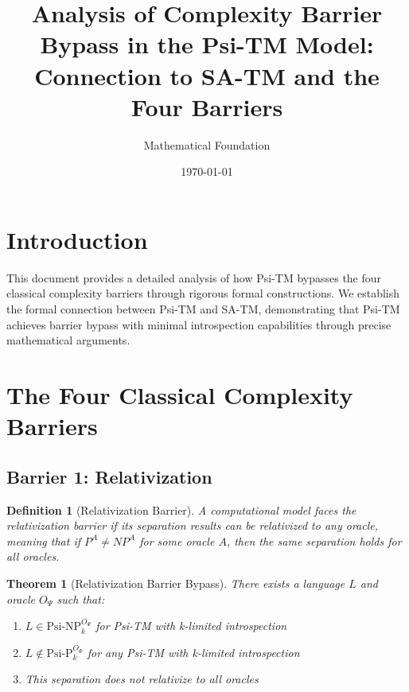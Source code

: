 \documentclass[11pt]{article}
\title{Analysis of Complexity Barrier Bypass in the Psi-TM Model:\\
Connection to SA-TM and the Four Barriers}
\author{Mathematical Foundation}
\date{\today}
\newtheorem{definition}{Definition}
\newtheorem{theorem}{Theorem}
\begin{document}
\maketitle

\section{Introduction}

This document provides a detailed analysis of how Psi-TM bypasses the four classical complexity barriers through rigorous formal constructions. We establish the formal connection between Psi-TM and SA-TM, demonstrating that Psi-TM achieves barrier bypass with minimal introspection capabilities through precise mathematical arguments.

\section{The Four Classical Complexity Barriers}

\subsection{Barrier 1: Relativization}

\begin{definition}[Relativization Barrier]
A computational model faces the relativization barrier if its separation results can be relativized to any oracle, meaning that if $P^A \neq NP^A$ for some oracle $A$, then the same separation holds for all oracles.
\end{definition}

\begin{theorem}[Relativization Barrier Bypass]
There exists a language $L$ and oracle $O_\Psi$ such that:
\begin{enumerate}
\item $L \in \text{Psi-NP}^{O_\Psi}_k$ for Psi-TM with k-limited introspection
\item $L \notin \text{Psi-P}^{O_\Psi}_k$ for any Psi-TM with k-limited introspection
\item This separation does not relativize to all oracles
\end{enumerate}
\end{theorem}
\end{document}
